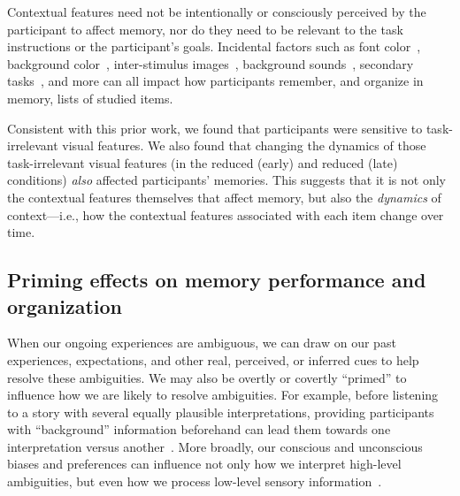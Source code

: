 \documentclass[11pt]{article}
\begin{document}
Contextual features need not be intentionally or consciously perceived by the
participant to affect memory, nor do they need to be relevant to the task
instructions or the participant's goals. Incidental factors such as font
color~\citep{JonePyc14}, background color~\citep{IsarIsar07}, inter-stimulus
images~\citep{GersEtal13, MannEtal16, ChiuEtal21}, background
sounds~\citep{BeamJone10, SahaSmit14}, secondary tasks~\citep{MasiSaha14,
PolyEtal09, OberLewa08}, and more can all impact how participants remember, and
organize in memory, lists of studied items.

Consistent with this prior work, we found that participants were sensitive to
task-irrelevant visual features. We also found that changing the dynamics of
those task-irrelevant visual features (in the reduced (early) and reduced
(late) conditions) \textit{also} affected participants' memories. This suggests
that it is not only the contextual features themselves that affect memory, but
also the \textit{dynamics} of context---i.e., how the contextual features
associated with each item change over time.

\subsection*{Priming effects on memory performance and organization}


When our ongoing experiences are ambiguous, we can draw on our past
experiences, expectations, and other real, perceived, or inferred cues to help
resolve these ambiguities. We may also be overtly or covertly ``primed'' to
influence how we are likely to resolve ambiguities. For example, before
listening to a story with several equally plausible interpretations, providing
participants with ``background'' information beforehand can lead them towards
one interpretation versus another~\citep{YeshEtal17}. More broadly, our
conscious and unconscious biases and preferences can influence not only how we
interpret high-level ambiguities, but even how we process low-level sensory
information~\citep{KataEtal23}.
\end{document}
